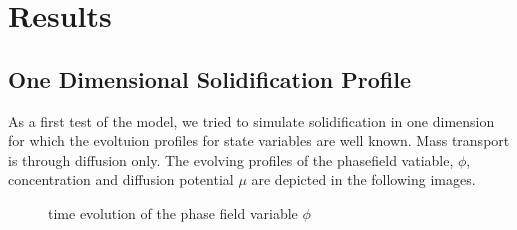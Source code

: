 \documentclass[12pt,a4paper]{report}
\begin{document}
\chapter{Results}
\section{One Dimensional Solidification Profile}

As a first test of the model, we tried to 
simulate solidification in one dimension for which the 
evoltuion profiles for state variables are well known. 
Mass transport is through diffusion only.
The evolving profiles of the phasefield vatiable, 
$\phi$, concentration and diffusion potential $\mu$ 
are depicted in the following images.

\begin{figure}[!htbp]
\centering
{}
\hspace{.25in}
\hspace{.25in}
\centering
\caption{time evolution of the phase field variable $\phi$}
\end{figure}
 
\end{document}
